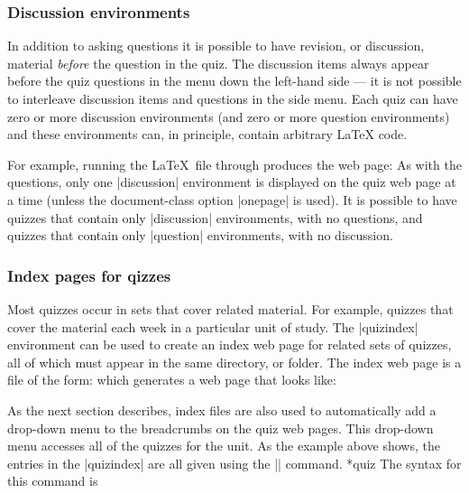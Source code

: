 \documentclass[svgnames]{article}
\begin{document}
  \subsubsection{Discussion environments}

In addition to asking questions it is possible to have revision, or
discussion, material \textit{before} the question in the quiz. The
discussion items always appear before the quiz questions in the menu
down the left-hand side --- it is not possible to interleave discussion
items and questions in the side menu. Each quiz can have zero or more
discussion environments (and zero or more question environments) and
these environments can, in principle, contain arbitrary \LaTeX{} code.

For example, running the \LaTeX\ file through \WebQuiz
produces the web page:
As with the questions, only one \LatexCode|discussion| environment is
displayed on the quiz web page at a time (unless the document-class
option \LatexCode|onepage| is used). It is possible to have quizzes
that contain only \LatexCode|discussion| environments, with no questions, and
quizzes that contain only \LatexCode|question| environments, with no
discussion.

\subsubsection{Index pages for qizzes}\label{SS:index}


  Most quizzes occur in sets that cover related material. For example,
  quizzes that cover the material each week in a particular unit of
  study. The \LatexCode|quizindex| environment can be used to create an
  index web page for related sets of quizzes, all of which must appear in the same
  directory, or folder. The index web page is a \WebQuiz file of the
  form:
  which generates a web page that looks like:

  As the next section describes, index files are also used to
  automatically add a drop-down menu to the breadcrumbs on the quiz web
  pages. This drop-down menu accesses all of the quizzes for the unit.
  As the example above shows, the entries in the \LatexCode|quizindex| are all
  given using the \LatexCode|\quiz| command.
  *{quiz}
  The syntax for this command is
\end{document}
